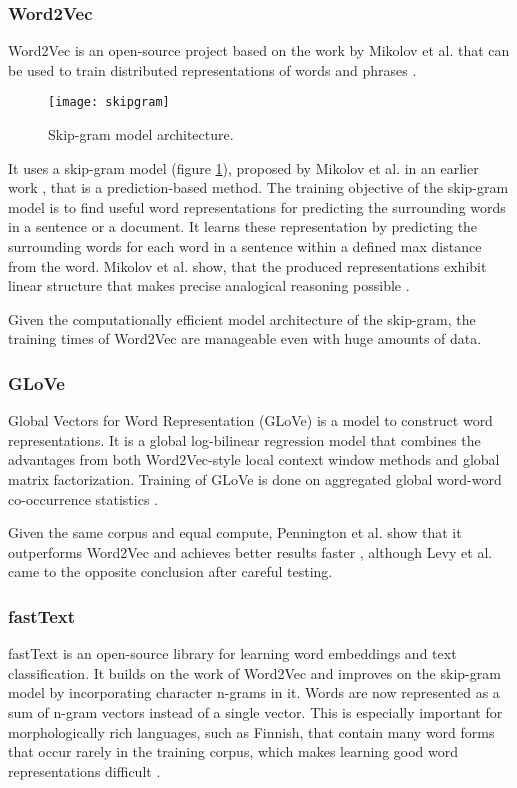 \subsubsection{Word2Vec} \label{Word2Vec}
Word2Vec is an open-source project based on the work by Mikolov et al. that can be used to train distributed representations of words and phrases \cite{mikolov2013}.

\begin{figure}[t]
\texttt{[image: skipgram]}
\centering
\caption{Skip-gram model architecture.}
\label{fig:skipgram}
\end{figure}

It uses a skip-gram model (figure \ref{fig:skipgram}), proposed by Mikolov et al. in an earlier work \cite{mikolov2013a}, that is a prediction-based method.
The training objective of the skip-gram model is to find useful word representations for predicting the surrounding words in a sentence or a document.
It learns these representation by predicting the surrounding words for each word in a sentence within a defined max distance from the word.
Mikolov et al. show, that the produced representations exhibit linear structure that makes precise analogical reasoning possible \cite{mikolov2013}.

Given the computationally efficient model architecture of the skip-gram, the training times of Word2Vec are manageable even with huge amounts of data.

\subsubsection{GLoVe} \label{GLoVe}
Global Vectors for Word Representation (GLoVe) is a model to construct word representations.
It is a global log-bilinear regression model that combines the advantages from both Word2Vec-style local context window methods and global matrix factorization.
Training of GLoVe is done on aggregated global word-word co-occurrence statistics \cite{pennington2014}.

Given the same corpus and equal compute, Pennington et al. show that it outperforms Word2Vec and achieves better results faster \cite{pennington2014}, although Levy et al. \cite{levy2015} came to the opposite conclusion after careful testing.

\subsubsection{fastText} \label{fastText}
fastText is an open-source library for learning word embeddings and text classification.
It builds on the work of Word2Vec and improves on the skip-gram model by incorporating character n-grams in it.
Words are now represented as a sum of n-gram vectors instead of a single vector.
This is especially important for morphologically rich languages, such as Finnish, that contain many word forms that occur rarely in the training corpus, which makes learning good word representations difficult \cite{bojanowski2017}.

